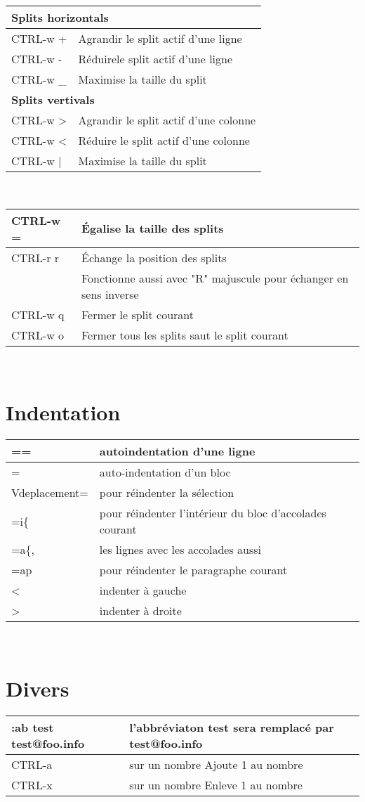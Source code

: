 \documentclass{article}
\begin{document}
\begin{tabular}{|p{3cm}| l|  }\hline
\multicolumn{2}{|l|}{\textbf{Splits horizontals}} \\ \hline
    CTRL-w + & Agrandir le split actif d'une ligne\\ \hline
    CTRL-w - & Réduirele split actif d'une ligne\\ \hline
    CTRL-w \_ & Maximise la taille du split\\ \hline
\multicolumn{2}{|l|}{\textbf{Splits vertivals}}\\ \hline
    CTRL-w > & Agrandir le split actif d'une colonne \\ \hline
    CTRL-w < & Réduire le split actif d'une colonne \\ \hline
    CTRL-w | & Maximise la taille du split\\ \hline
\end{tabular}\\[1.5em]


\begin{tabular}{|p{3cm}| l|  }\hline
    CTRL-w = & Égalise la taille des splits \\ \hline
    CTRL-r r & Échange la position des splits\\
    & Fonctionne aussi avec "R" majuscule pour échanger en sens inverse \\ \hline
    CTRL-w q & Fermer le split courant \\ \hline
    CTRL-w o & Fermer tous les splits saut le split courant \\ \hline
\end{tabular}\\


\section{Indentation}
\begin{tabular}{|p{3cm}| l|  }
	\hline
	== & autoindentation d'une ligne\\ \hline
	= & auto-indentation d'un bloc\\ \hline
	V{deplacement}= & pour réindenter la sélection\\ \hline
	=i\{ & pour réindenter l'intérieur du bloc d'accolades courant\\ \hline
	=a\{, & les lignes avec les accolades aussi\\ \hline
	=ap & pour réindenter le paragraphe courant\\ \hline
	< & indenter à gauche\\ \hline
	> & indenter à droite\\ \hline
\end{tabular}\\

\section{Divers}
\begin{tabular}{|p{4cm}| l|  }
	\hline
	:ab test test@foo.info 	& l'abbréviaton test sera remplacé par test@foo.info \\ \hline
    CTRL-a &sur un nombre Ajoute 1 au nombre\\ \hline
    CTRL-x &sur un nombre Enleve 1 au nombre\\ \hline
\end{tabular}\\
\end{document}
